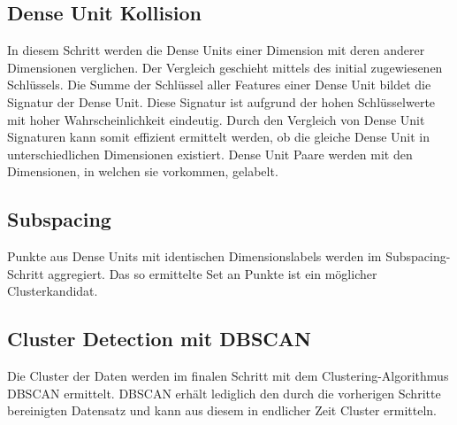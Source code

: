 \subsection{Dense Unit Kollision}
In diesem Schritt werden die Dense Units einer Dimension mit deren anderer Dimensionen verglichen. Der Vergleich geschieht mittels des initial zugewiesenen Schlüssels. Die Summe der Schlüssel aller Features einer Dense Unit bildet die Signatur der Dense Unit. Diese Signatur ist aufgrund der hohen Schlüsselwerte mit hoher Wahrscheinlichkeit eindeutig. Durch den Vergleich von Dense Unit Signaturen kann somit effizient ermittelt werden, ob die gleiche Dense Unit in unterschiedlichen Dimensionen existiert. Dense Unit Paare werden mit den Dimensionen, in welchen sie vorkommen, gelabelt.

\subsection{Subspacing}
Punkte aus Dense Units mit identischen Dimensionslabels werden im Subspacing-Schritt aggregiert. Das so ermittelte Set an Punkte ist ein möglicher Clusterkandidat.

\subsection{Cluster Detection mit DBSCAN}
Die Cluster der Daten werden im finalen Schritt mit dem Clustering-Algorithmus DBSCAN ermittelt. DBSCAN erhält lediglich den durch die vorherigen Schritte bereinigten Datensatz und kann aus diesem in endlicher Zeit Cluster ermitteln.